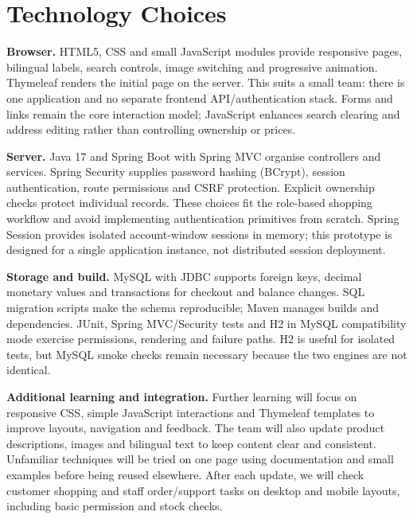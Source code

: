 \documentclass[11pt,a4paper]{article}
\begin{document}
\section{Technology Choices}
\textbf{Browser.} HTML5, CSS and small JavaScript modules provide responsive pages, bilingual labels, search controls, image switching and progressive animation. Thymeleaf renders the initial page on the server. This suits a small team: there is one application and no separate frontend API/authentication stack. Forms and links remain the core interaction model; JavaScript enhances search clearing and address editing rather than controlling ownership or prices.

\textbf{Server.} Java 17 and Spring Boot with Spring MVC organise controllers and services. Spring Security supplies password hashing (BCrypt), session authentication, route permissions and CSRF protection. Explicit ownership checks protect individual records. These choices fit the role-based shopping workflow and avoid implementing authentication primitives from scratch. Spring Session provides isolated account-window sessions in memory; this prototype is designed for a single application instance, not distributed session deployment.

\textbf{Storage and build.} MySQL with JDBC supports foreign keys, decimal monetary values and transactions for checkout and balance changes. SQL migration scripts make the schema reproducible; Maven manages builds and dependencies. JUnit, Spring MVC/Security tests and H2 in MySQL compatibility mode exercise permissions, rendering and failure paths. H2 is useful for isolated tests, but MySQL smoke checks remain necessary because the two engines are not identical.

\textbf{Additional learning and integration.} Further learning will focus on responsive CSS, simple JavaScript interactions and Thymeleaf templates to improve layouts, navigation and feedback. The team will also update product descriptions, images and bilingual text to keep content clear and consistent. Unfamiliar techniques will be tried on one page using documentation and small examples before being reused elsewhere. After each update, we will check customer shopping and staff order/support tasks on desktop and mobile layouts, including basic permission and stock checks.
\end{document}
